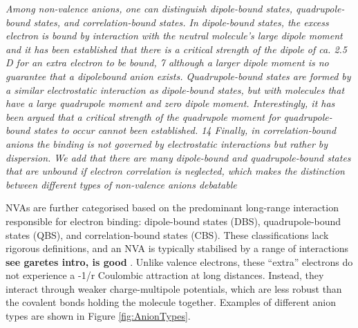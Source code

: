 \textit{Among non-valence anions, one can distinguish dipole-bound states, quadrupole-bound states, and correlation-bound states.
In dipole-bound states, the excess electron is bound by
interaction with the neutral molecule's large dipole moment
and it has been established that there is a critical strength of
the dipole of ca. 2.5 D for an extra electron to be bound, 7
although a larger dipole moment is no guarantee that a dipolebound anion exists. Quadrupole-bound states are formed by a
similar electrostatic interaction as dipole-bound states, but
with molecules that have a large quadrupole moment and zero
dipole moment. Interestingly, it has been argued that a critical
strength of the quadrupole moment for quadrupole-bound
states to occur cannot been established. 14 Finally, in
correlation-bound anions the binding is not governed by electrostatic interactions but rather by dispersion. We add that
there are many dipole-bound and quadrupole-bound states that
are unbound if electron correlation is neglected, which makes
the distinction between different types of non-valence anions
debatable} 

NVAs are further categorised based on the predominant long-range interaction responsible for electron binding: dipole-bound states (DBS), quadrupole-bound states (QBS), and correlation-bound states (CBS). These classifications lack rigorous definitions, and an NVA is typically stabilised by a range of interactions \textbf{see garetes intro, is good} \cite{simons2008molecular,herbert2015quantum,abdoul1998electrons,simons2023molecular,jordan2003theory}. Unlike valence electrons, these ``extra'' electrons do not experience a -1/r Coulombic attraction at long distances. Instead, they interact through weaker charge-multipole potentials, which are less robust than the covalent bonds holding the molecule together. Examples of different anion types are shown in Figure \ref{fig:AnionTypes}.

